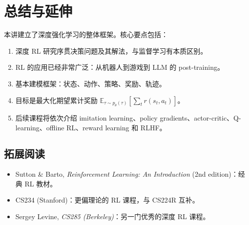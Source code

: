 \section{总结与延伸}

本讲建立了深度强化学习的整体框架。核心要点包括：

\begin{enumerate}
    \item 深度 RL 研究序贯决策问题及其解法，与监督学习有本质区别。
    \item RL 的应用已经非常广泛：从机器人到游戏到 LLM 的 post-training。
    \item 基本建模框架：状态、动作、策略、奖励、轨迹。
    \item 目标是最大化期望累计奖励 $\mathbb{E}_{\tau \sim p_\theta(\tau)} \left[\sum_t r(s_t, a_t)\right]$。
    \item 后续课程将依次介绍 imitation learning、policy gradients、actor-critic、Q-learning、offline RL、reward learning 和 RLHF。
\end{enumerate}

\subsection{拓展阅读}
\begin{itemize}
    \item Sutton \& Barto, \textit{Reinforcement Learning: An Introduction} (2nd edition)：经典 RL 教材。
    \item CS234 (Stanford)：更偏理论的 RL 课程，与 CS224R 互补。
    \item Sergey Levine, \textit{CS285 (Berkeley)}：另一门优秀的深度 RL 课程。
\end{itemize}



